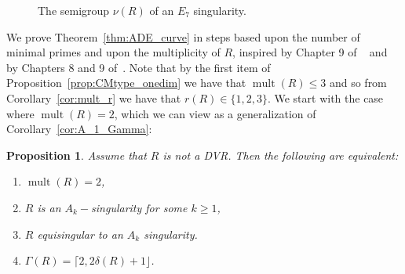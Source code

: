 \documentclass{article}
\newtheorem{proposition}[theorem]{Proposition}
\DeclareMathOperator{\mult}{mult}
\numberwithin{theorem}{section}
\begin{document}
\begin{figure}[ht]
\centering


\caption{The semigroup $\nu(R)$ of an $E_7$ singularity.}
\end{figure}



We prove Theorem~\ref{thm:ADE_curve} in steps based upon the number of minimal primes and upon the multiplicity of $R$, inspired by Chapter 9 of ~\cite{yoshino1990maximal} and by Chapters 8 and 9 of~\cite{lynch2010class}. Note that by the first item of Proposition~\ref{prop:CMtype_onedim} we have that $\mult(R) \leq 3$ and so from Corollary~\ref{cor:mult_r} we have that $r(R) \in \{1,2,3\}$. We start with the case where $\mult(R)=2$, which we can view as a generalization of Corollary~\ref{cor:A_1_Gamma}:

\begin{proposition}\label{prop:equiA}
    Assume that $R$ is not a DVR. Then the following are equivalent:
    \begin{enumerate}
        \item $\mult(R)=2$, 
        \item $R$ is an $A_k-$singularity for some $k \geq 1$, 
        \item $R$ equisingular to an $A_k$ singularity. 
        \item $\Gamma(R) = \lceil 2, 2\delta(R)+1 \rfloor$. 
    \end{enumerate}
\end{proposition}
\end{document}
